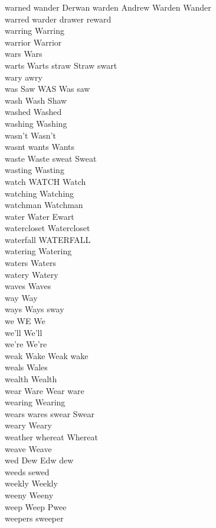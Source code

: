 warned wander Derwan warden Andrew Warden Wander\\
warred warder drawer reward\\
warring Warring\\
warrior Warrior\\
wars Wars\\
warts Warts straw Straw swart\\
wary awry\\
was Saw WAS Was saw\\
wash Wash Shaw\\
washed Washed\\
washing Washing\\
wasn't Wasn't\\
wasnt wants Wants\\
waste Waste sweat Sweat\\
wasting Wasting\\
watch WATCH Watch\\
watching Watching\\
watchman Watchman\\
water Water Ewart\\
watercloset Watercloset\\
waterfall WATERFALL\\
watering Watering\\
waters Waters\\
watery Watery\\
waves Waves\\
way Way\\
ways Ways sway\\
we WE We\\
we'll We'll\\
we're We're\\
weak Wake Weak wake\\
weals Wales\\
wealth Wealth\\
wear Ware Wear ware\\
wearing Wearing\\
wears wares swear Swear\\
weary Weary\\
weather whereat Whereat\\
weave Weave\\
wed Dew Edw dew\\
weeds sewed\\
weekly Weekly\\
weeny Weeny\\
weep Weep Pwee\\
weepers sweeper\\
